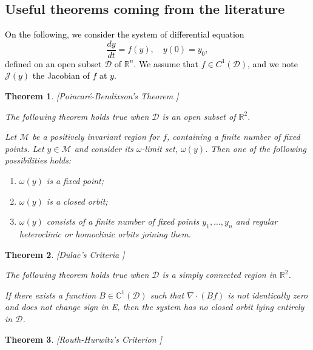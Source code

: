 \documentclass{article}
\newcommand{\vdeux}[1]{\textcolor{black}{#1}}
\newtheorem{theorem}{Theorem}
\theoremstyle{definition}
\theoremstyle{remark}
\begin{document}
\begin{appendix}
\section{Useful theorems coming from the literature} \label{sec:litterature theorems}
\vdeux{
On the following, we consider the system of differential equation
\begin{equation}
\dfrac{dy}{dt} = f(y), \quad y(0) = y_0,
\label{equation:generic system}
\end{equation}
defined on an open subset $\mathcal{D}$ of $\mathbb{R}^n$. We assume that $f \in C^1(\mathcal{D})$, and we note $\mathcal{J}(y)$ the Jacobian of $f$ at $y$.}

\begin{theorem}  \label{theorem:Poincaré-Bendixson} [Poincaré-Bendixson's Theorem  \cite{wiggins_introduction_2003}]

The following theorem holds true when $\mathcal{D}$ is an open subset of $\mathbb R ^2$.

Let $\mathcal{M}$ be a positively invariant region for $f$, containing a finite number of fixed points. Let $y \in \mathcal{M}$ and consider its $\omega$-limit set, $\omega(y)$. Then one of the following possibilities holds:
\begin{enumerate}
\item $\omega(y)$ is a fixed point;
\item $\omega(y)$ is a closed orbit;
\item $\omega(y)$ consists of a finite number of fixed points $y_1, \ldots, y_n$ and regular heteroclinic or homoclinic orbits joining them.
\end{enumerate}
\end{theorem}

\begin{theorem} \label{theorem:Dulac} [Dulac's Criteria \cite{perko_differential_1996}]

The following theorem holds true when $\mathcal{D}$ is a simply connected region in $\mathbb R ^2$. 

If there exists a function $B \in \mathbb{C}^1(\mathcal{D})$ such that $\nabla \cdot (Bf)$ is not identically zero and does not change sign in E, then the system has no closed orbit lying entirely in $\mathcal{D}$.
\end{theorem}

\begin{theorem} \label{theorem:Routh-Hurwitz} [Routh-Hurwitz's Criterion \cite{wiggins_introduction_2003}]


\end{theorem}
\end{appendix}
\end{document}
